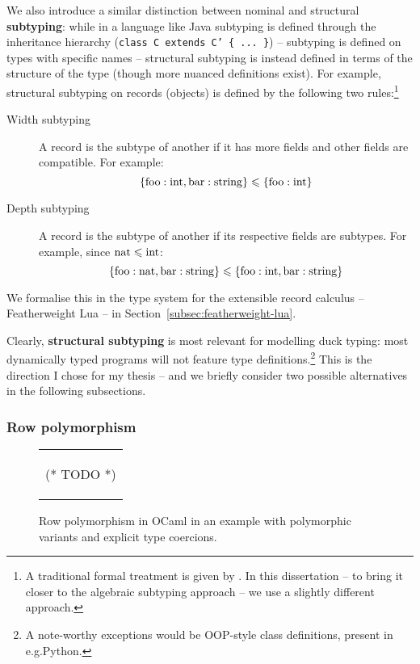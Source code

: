 We also introduce a similar distinction between nominal and structural \textbf{subtyping}: while in a language like Java subtyping is defined through the inheritance hierarchy (\texttt{class C extends C' \{ ... \}}) -- subtyping is defined on types with specific names -- structural subtyping is instead defined in terms of the structure of the type (though more nuanced definitions exist). For example, structural subtyping on records (objects) is defined by the following two rules:\footnote{A traditional formal treatment is given by \textcite{pierce-book}. In this dissertation -- to bring it closer to the algebraic subtyping approach -- we use a slightly different approach.}
\begin{description}
    \item[Width subtyping] A record is the subtype of another if it has more fields and other fields are compatible. For example: $$ \{ \mathrm{foo} : \mathrm{int}, \mathrm{bar} : \mathrm{string} \} \leqslant \{ \mathrm{foo} : \mathrm{int} \} $$
    \item[Depth subtyping] A record is the subtype of another if its respective fields are subtypes. For example, since $\mathrm{nat} \leqslant \mathrm{int}$:
    $$ \{ \mathrm{foo}: \mathrm{nat}, \mathrm{bar}: \mathrm{string} \} \leqslant \{ \mathrm{foo}: \mathrm{int}, \mathrm{bar}: \mathrm{string} \} $$
\end{description}
We formalise this in the type system for the extensible record calculus -- Featherweight Lua -- in Section~\ref{subsec:featherweight-lua}.

Clearly, \textbf{structural subtyping} is most relevant for modelling duck typing: most dynamically typed programs will not feature type definitions.\footnote{A note-worthy exceptions would be OOP-style class definitions, present in e.g.\@ Python.} This is the direction I chose for my thesis -- and we briefly consider two possible alternatives in the following subsections.

\subsubsection{Row polymorphism}

\begin{figure}
    \centering
    \begin{tabular}{c}
    \begin{ocaml}
(* TODO *)
    \end{ocaml}
    \end{tabular}
    \caption{Row polymorphism in OCaml in an example with polymorphic variants and explicit type coercions.}
    \label{fig:ocaml-row-polymorphism}
\end{figure}

